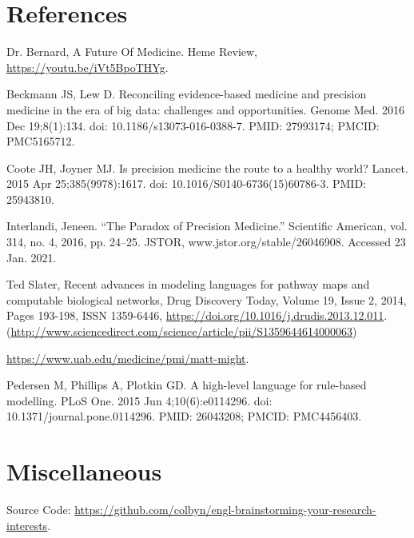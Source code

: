 \newpage
\section*{References}

\newcommand{\source}[2]{
\item [({#1})]{#2}
}

\begin{description}[align=right]
\source{Bernard}{Dr. Bernard, A Future Of Medicine. Heme Review, \url{https://youtu.be/iVt5BpoTHYg}.}
\source{Beckmann}{Beckmann JS, Lew D. Reconciling evidence-based medicine and precision medicine in the era of big data: challenges and opportunities. Genome Med. 2016 Dec 19;8(1):134. doi: 10.1186/s13073-016-0388-7. PMID: 27993174; PMCID: PMC5165712.}
\source{Coote}{Coote JH, Joyner MJ. Is precision medicine the route to a healthy world? Lancet. 2015 Apr 25;385(9978):1617. doi: 10.1016/S0140-6736(15)60786-3. PMID: 25943810.}
\source{Interlandi}{Interlandi, Jeneen. “The Paradox of Precision Medicine.” Scientific American, vol. 314, no. 4, 2016, pp. 24–25. JSTOR, www.jstor.org/stable/26046908. Accessed 23 Jan. 2021.}
\source{Slater}{Ted Slater, Recent advances in modeling languages for pathway maps and computable biological networks, Drug Discovery Today, Volume 19, Issue 2, 2014, Pages 193-198, ISSN 1359-6446, \url{https://doi.org/10.1016/j.drudis.2013.12.011}. (\url{http://www.sciencedirect.com/science/article/pii/S1359644614000063})}
\source{Might}{\url{https://www.uab.edu/medicine/pmi/matt-might}.}
\source{Kappa}{Pedersen M, Phillips A, Plotkin GD. A high-level language for rule-based modelling. PLoS One. 2015 Jun 4;10(6):e0114296. doi: 10.1371/journal.pone.0114296. PMID: 26043208; PMCID: PMC4456403.}
\end{description}

\section*{Miscellaneous}
\begin{center}
    Source Code: \url{https://github.com/colbyn/engl-brainstorming-your-research-interests}.
\end{center}

